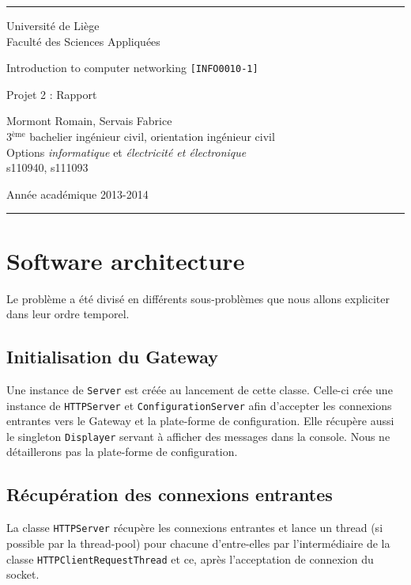 \documentclass[a4paper,11pt]{article}
\begin{document}
\rule{1\linewidth}{1px}
{ \sc
\begin{center}
{\small Université de Liège}\\
{\small Faculté des Sciences Appliquées}

\end{center}

\vfill
\begin{center}

{\Huge Introduction to computer networking {\LARGE \tt [INFO0010-1]}\\}
\end{center}
\begin{center}
{\Huge Projet 2 : Rapport}
\end{center}
\begin{center}
Mormont Romain, Servais Fabrice\\
{\small 3$^{\text{ème}}$  bachelier ingénieur civil, orientation ingénieur civil}\\
{\small Options \textit{informatique} et \textit{électricité et électronique}}\\
{\small s110940, s111093}
\end{center}

\vfill
\begin{center}
Année académique 2013-2014\\
\end{center}
}
\rule{1\linewidth}{1px}
\newpage

\section{Software architecture}
Le problème a été divisé en différents sous-problèmes que nous allons expliciter dans leur ordre temporel.

	\subsection{Initialisation du Gateway}
Une instance de \texttt{Server} est créée au lancement de cette classe. Celle-ci crée une instance de \texttt{HTTPServer} et \texttt{ConfigurationServer} afin d'accepter les connexions entrantes vers le Gateway et la plate-forme de configuration. Elle récupère aussi le singleton \texttt{Displayer} servant à afficher des messages dans la console. Nous ne détaillerons pas la plate-forme de configuration.

	\subsection{Récupération des connexions entrantes}
La classe \texttt{HTTPServer} récupère les connexions entrantes et lance un thread (si possible par la thread-pool) pour chacune d'entre-elles par l'intermédiaire de la classe \texttt{HTTPClientRequestThread} et ce, après l'acceptation de connexion du socket.
\end{document}
